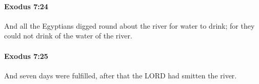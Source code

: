 		\paragraph{Exodus 7:24} %
			\label{EXODUS-7-24}

			And all the Egyptians digged round about the river for water to drink; for they could not drink of the water of the river.


		\paragraph{Exodus 7:25} %
			\label{EXODUS-7-25}

			And seven days were fulfilled, after that the LORD had smitten the river.

